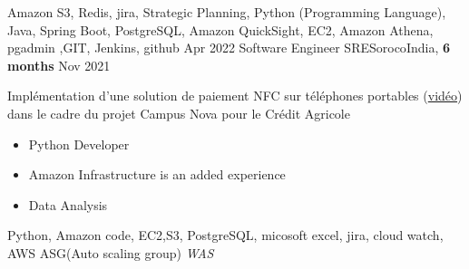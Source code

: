 \begin{experiences}
{\begin{itemize}
                      \end{itemize}
                    }
                    {
                      Amazon S3, Redis, jira, Strategic Planning, Python (Programming Language), Java, Spring Boot, PostgreSQL, Amazon QuickSight, EC2, Amazon Athena, pgadmin
                      ,GIT, Jenkins, github
                    }
  \emptySeparator
  \experience
  {Apr 2022}  {Software Engineer SRE}{Soroco}{India, \textbf{6 months}}  
  {Nov 2021}   {
                      Implémentation d'une solution de paiement NFC sur téléphones portables (\href{http://www.nouvo.ch/s-007}{vidéo}) 
                      dans le cadre du projet Campus Nova pour le Crédit Agricole  
                      \begin{itemize}
                        \item Python Developer                                          
                        \item Amazon Infrastructure is an added experience  
                        \item Data Analysis  
                      \end{itemize}
                  }
                  {Python, Amazon code, EC2,S3, PostgreSQL, micosoft excel, jira, cloud watch, AWS ASG(Auto scaling group) \emph{WAS}}  
\end{experiences}
